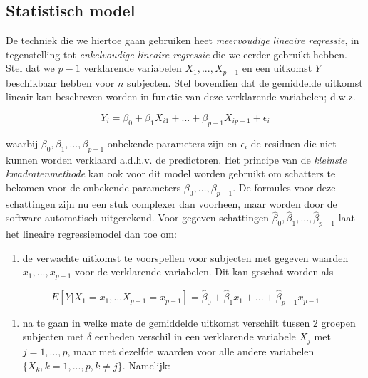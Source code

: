 \documentclass[
  12pt,dutch,coursenotes]{book}
\providecommand{\tightlist}{%
  \setlength{\itemsep}{0pt}\setlength{\parskip}{0pt}}
\theoremstyle{definition}
\theoremstyle{definition}
\theoremstyle{definition}
\theoremstyle{definition}
\theoremstyle{remark}
\begin{document}
\hypertarget{statistisch-model}{%
\subsection{Statistisch model}\label{statistisch-model}}

De techniek die we hiertoe gaan gebruiken heet \emph{meervoudige lineaire regressie}, in tegenstelling tot \emph{enkelvoudige lineaire regressie} die we eerder gebruikt hebben.
Stel dat we \(p-1\) verklarende variabelen \(X_1,...,X_{p-1}\) en een uitkomst \(Y\) beschikbaar hebben voor \(n\)
subjecten.
Stel bovendien dat de gemiddelde uitkomst lineair kan beschreven worden in functie van deze verklarende variabelen; d.w.z.

\[
Y_i =\beta_0 + \beta_1 X_{i1} + ... +\beta_{p-1} X_{ip-1} + \epsilon_i
\]

waarbij \(\beta_0,\beta_1,...,\beta_{p-1}\) onbekende parameters zijn en \(\epsilon_i\) de residuen die niet kunnen worden verklaard a.d.h.v. de predictoren.
Het principe van de \emph{kleinste kwadratenmethode} kan ook voor dit model worden gebruikt om schatters te bekomen voor de onbekende parameters
\(\beta_0, \ldots, \beta_{p-1}\).
De formules voor deze schattingen zijn nu een stuk complexer dan voorheen, maar worden door de software automatisch uitgerekend.
Voor gegeven
schattingen \(\hat{\beta}_0,\hat{\beta}_1,...,\hat{\beta}_{p-1}\) laat het lineaire
regressiemodel dan toe om:

\begin{enumerate}
\def\labelenumi{\arabic{enumi}.}
\tightlist
\item
  de verwachte uitkomst te voorspellen voor subjecten met gegeven
  waarden \(x_1,...,x_{p-1}\) voor de verklarende variabelen.
  Dit kan geschat worden als
\end{enumerate}

\[
E[Y\vert X_1=x_1, \ldots X_{p-1}=x_{p-1}]=\hat{\beta}_0+\hat{\beta}_1x_1+...+\hat{\beta}_{p-1}x_{p-1}
\]

\begin{enumerate}
\def\labelenumi{\arabic{enumi}.}
\setcounter{enumi}{1}
\tightlist
\item
  na te gaan in welke mate de gemiddelde uitkomst verschilt tussen 2 groepen subjecten met \(\delta\) eenheden verschil in een verklarende variabele \(X_j\) met \(j=1,\ldots,p\), maar met dezelfde waarden voor alle andere variabelen \(\{X_k,k=1,...,p,k\ne j\}\).
  Namelijk:
\end{enumerate}
\end{document}
